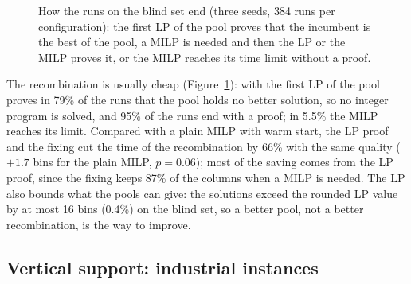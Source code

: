 \begin{figure}[t]
\centering
{}
\caption{How the runs on the blind set end (three seeds, 384 runs per configuration): the first LP of the pool proves that the incumbent is the best of the pool, a MILP is needed and then the LP or the MILP proves it, or the MILP reaches
its time limit without a proof.}
\label{fig:e-outcome}
\end{figure}

The recombination is usually cheap (Figure~\ref{fig:e-outcome}): with \cfgbal{} the first LP of the pool proves in 79\%
of the runs that the pool holds no better solution, so no integer program is solved, and 95\% of the runs end with a
proof; in 5.5\% the MILP reaches its limit. Compared with a plain MILP with warm start, the LP proof and the fixing cut
the time of the recombination by 66\% with the same quality ($+1.7$ bins for the plain MILP, $p=0.06$); most of the
saving comes from the LP proof, since the fixing keeps 87\% of the columns when a MILP is needed. The LP also bounds what
the pools can give: the solutions exceed the rounded LP value by at most 16 bins (0.4\%) on the blind set, so a better
pool, not a better recombination, is the way to improve.

\subsection{Vertical support: industrial instances}
\label{sec:e-ind}

